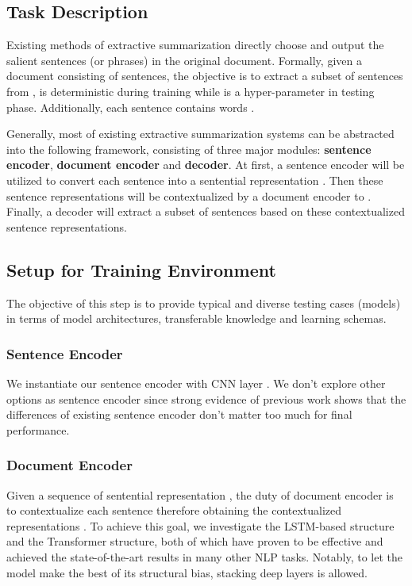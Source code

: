 \documentclass[11pt,a4paper]{article}
\begin{document}
\subsection{Task Description}


Existing methods of extractive summarization directly choose and output the salient sentences (or phrases) in the original document.
Formally, given a document  consisting of  sentences, the objective is to extract a subset of sentences   from ,
 is deterministic during training while is a hyper-parameter in testing phase.
Additionally, each sentence contains  words .


Generally, most of existing extractive summarization systems can be abstracted into the following framework, consisting of three major modules: \textbf{sentence encoder}, \textbf{document encoder} and \textbf{decoder}.
At first, a sentence encoder will be utilized to convert each sentence  into a sentential representation .
Then these sentence representations will be contextualized by a document encoder to . Finally, a decoder will extract a subset of sentences based on these contextualized sentence representations.










\subsection{Setup for Training Environment}
The objective of this step is to provide typical and diverse testing cases (models) in terms of model architectures, transferable knowledge and learning schemas.



\subsubsection{Sentence Encoder}
We instantiate our sentence encoder with CNN layer \cite{kim2014convolutional}. We don't explore other options as sentence encoder since strong evidence of previous work \cite{kedzie2018content} shows that the differences of existing sentence encoder don't matter too much for final performance.






\subsubsection{Document Encoder}
Given a sequence of sentential representation , the duty of document encoder is to contextualize each sentence therefore obtaining the contextualized representations .
To achieve this goal,  we investigate the LSTM-based structure and the Transformer structure, both of which have proven to be effective and achieved the state-of-the-art results in many other NLP tasks. Notably, to let the model make the best of its structural bias, stacking deep layers is allowed.
\end{document}
